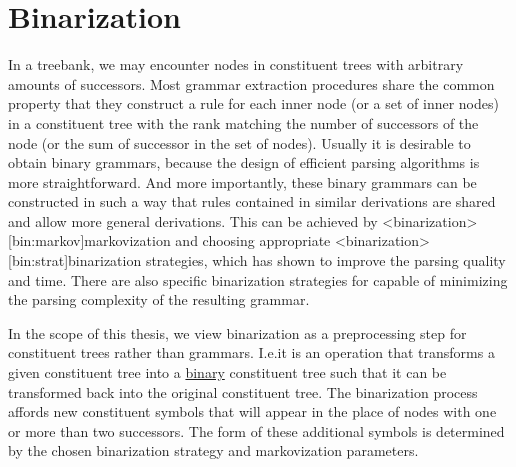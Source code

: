 \documentclass[../document.tex]{subfiles}
\begin{document}

    \section{Binarization} 
    In a treebank, we may encounter nodes in constituent trees with arbitrary amounts of successors.
    Most grammar extraction procedures share the common property that they construct a rule for each inner node (or a set of inner nodes) in a constituent tree with the rank matching the number of successors of the node (or the sum of successor in the set of nodes).
    Usually it is desirable to obtain binary grammars, because the design of efficient parsing algorithms is more straightforward.
    And more importantly, these binary grammars can be constructed in such a way that rules contained in similar derivations are shared and allow more general derivations.
    This can be achieved by <binarization>[bin:markov]{markovization} and choosing appropriate <binarization>[bin:strat]{binarization strategies}, which has shown to improve the parsing quality and time. \citep{Son08,Cra12}
    There are also specific binarization strategies for  capable of minimizing the parsing complexity of the resulting grammar. \citep{Gil10}

    In the scope of this thesis, we view binarization as a preprocessing step for constituent trees rather than grammars.
    I.e.\@ it is an operation that transforms a given constituent tree into a \hyperlink{binctree}{binary} constituent tree such that it can be transformed back into the original constituent tree.
    The binarization process affords new constituent symbols that will appear in the place of nodes with one or more than two successors.
    The form of these additional symbols is determined by the chosen binarization strategy and markovization parameters.
\end{document}
